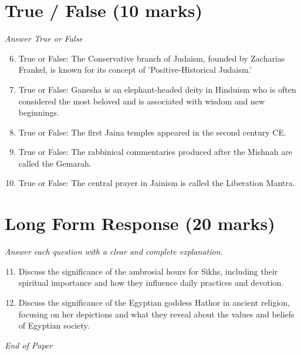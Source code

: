\documentclass[12pt]{article}
\begin{document}
\section*{True / False (10 marks)}
\textit{Answer True or False}
\begin{enumerate}[label=\arabic*.]
\setcounter{enumi}{5}
\item True or False: The Conservative branch of Judaism, founded by Zacharias Frankel, is known for its concept of 'Positive-Historical Judaism.'
\item True or False: Ganesha is an elephant-headed deity in Hinduism who is often considered the most beloved and is associated with wisdom and new beginnings.
\item True or False: The first Jaina temples appeared in the second century CE.
\item True or False: The rabbinical commentaries produced after the Mishnah are called the Gemarah.
\item True or False: The central prayer in Jainism is called the Liberation Mantra.
\end{enumerate}

\section*{Long Form Response (20 marks)}
\textit{Answer each question with a clear and complete explanation.}
\begin{enumerate}[label=\arabic*.]
\setcounter{enumi}{10}
\item Discuss the significance of the ambrosial hours for Sikhs, including their spiritual importance and how they influence daily practices and devotion.
\item Discuss the significance of the Egyptian goddess Hathor in ancient religion, focusing on her depictions and what they reveal about the values and beliefs of Egyptian society.
\end{enumerate}

\vfill
\noindent\textit{End of Paper}
\end{document}
